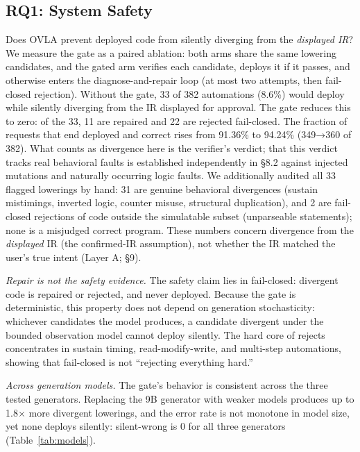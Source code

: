 \documentclass[sigconf,nonacm,anonymous,review]{acmart}
\begin{document}
\subsection{RQ1: System Safety}

Does OVLA prevent deployed code from silently diverging from the \emph{displayed IR}? We measure the gate as a paired ablation: both arms share the same lowering candidates, and the gated arm verifies each candidate, deploys it if it passes, and otherwise enters the diagnose-and-repair loop (at most two attempts, then fail-closed rejection). Without the gate, 33 of 382 automations (8.6\%) would deploy while silently diverging from the IR displayed for approval. The gate reduces this to zero: of the 33, 11 are repaired and 22 are rejected fail-closed. The fraction of requests that end deployed and correct rises from 91.36\% to 94.24\% (349→360 of 382). What counts as divergence here is the verifier's verdict; that this verdict tracks real behavioral faults is established independently in \S8.2 against injected mutations and naturally occurring logic faults. We additionally audited all 33 flagged lowerings by hand: 31 are genuine behavioral divergences (sustain mistimings, inverted logic, counter misuse, structural duplication), and 2 are fail-closed rejections of code outside the simulatable subset (unparseable statements); none is a misjudged correct program. These numbers concern divergence from the \emph{displayed} IR (the confirmed-IR assumption), not whether the IR matched the user's true intent (Layer A; \S9).

\emph{Repair is not the safety evidence.} The safety claim lies in fail-closed: divergent code is repaired or rejected, and never deployed. Because the gate is deterministic, this property does not depend on generation stochasticity: whichever candidates the model produces, a candidate divergent under the bounded observation model cannot deploy silently. The hard core of rejects concentrates in sustain timing, read-modify-write, and multi-step automations, showing that fail-closed is not ``rejecting everything hard.''

\emph{Across generation models.} The gate's behavior is consistent across the three tested generators. Replacing the 9B generator with weaker models produces up to 1.8$\times$ more divergent lowerings, and the error rate is not monotone in model size, yet none deploys silently: silent-wrong is 0 for all three generators (Table~\ref{tab:models}).
\end{document}
